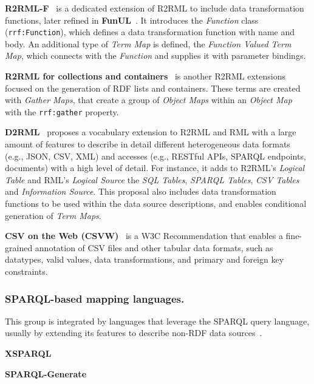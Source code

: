 \noindent\textbf{R2RML-F}~\parencite{debruyne2016r2rmlf} is a dedicated extension of R2RML to include data transformation functions, later refined in \textbf{FunUL}~\parencite{junior2016funul}. It introduces the \textit{Function} class (\texttt{rrf:Function}), which defines a data transformation function with name and body. An additional type of \textit{Term Map} is defined, the \textit{Function Valued Term Map}, which connects with the \textit{Function} and supplies it with parameter bindings. 

\noindent\textbf{R2RML for collections and containers}~\parencite{debruyne2017R2RML-collections} is another R2RML extensions focused on the generation of RDF lists and containers. These terms are created with \textit{Gather Maps}, that create a group of \textit{Object Maps} within an \textit{Object Map} with the \texttt{rrf:gather} property. 

\noindent\textbf{D2RML}~\parencite{chortaras2018d2rml} proposes a vocabulary extension to R2RML and RML with a large amount of features to describe in detail different heterogeneous data formats (e.g., JSON, CSV, XML) and accesses (e.g., RESTful APIs, SPARQL endpoints, documents) with a high level of detail. For instance, it adds to R2RML's \textit{Logical Table} and RML's \textit{Logical Source} the \textit{SQL Tables}, \textit{SPARQL Tables}, \textit{CSV Tables} and \textit{Information Source}. This proposal also includes data transformation functions to be used within the data source descriptions, and enables conditional generation of \textit{Term Maps}. 

\noindent\textbf{CSV on the Web (CSVW)}~\parencite{Tennison2015csvw} is a W3C Recommendation that enables a fine-grained annotation of CSV files and other tabular data formats, such as datatypes, valid values, data transformations, and primary and foreign key constraints. 




\subsubsection{SPARQL-based mapping languages.}
\label{sec:chp2_SPARQL-languages} 

This group is integrated by languages that leverage the SPARQL query language, usually by extending its features to describe non-RDF data sources~\parencite{harris2013sparql}. 


\noindent\textbf{XSPARQL}~\parencite{Bischof2012xsparql}

\noindent\textbf{SPARQL-Generate}~\parencite{Lefrancois2017sparqlgenerate}

